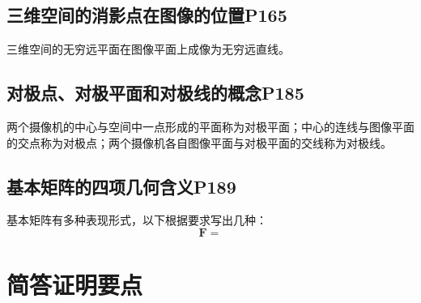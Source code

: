 \documentclass[11pt]{article}
\begin{document}
\subsection{三维空间的消影点在图像的位置P165}
三维空间的无穷远平面在图像平面上成像为无穷远直线。
\subsection{对极点、对极平面和对极线的概念P185}
两个摄像机的中心与空间中一点形成的平面称为对极平面；中心的连线与图像平面的交点称为对极点；两个摄像机各自图像平面与对极平面的交线称为对极线。
\subsection{基本矩阵的四项几何含义P189}
基本矩阵有多种表现形式，以下根据要求写出几种：
\begin{equation*}
  \mathbf{F}=
\end{equation*}


\section{简答证明要点}
\end{document}
